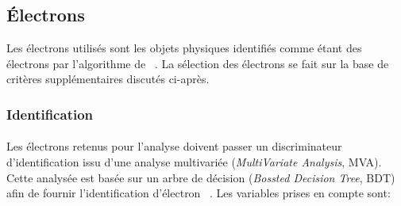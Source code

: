 \subsection{Électrons}\label{chapter-HTT_analysis-section-objects-electrons}
Les électrons utilisés sont les objets physiques identifiés comme étant des électrons par l'algorithme de \PF~\cite{particle-flow}.
La sélection des électrons se fait sur la base de critères supplémentaires discutés ci-après.

\subsubsection{Identification}\label{chapter-HTT_analysis-section-objects-electron-ID}
\paragraph{\EleIDMVA}
Les électrons retenus pour l'analyse doivent passer un discriminateur d'identification issu d'une analyse multivariée (\emph{MultiVariate Analysis}, MVA).
Cette analysée est basée sur un arbre de décision (\emph{Bossted Decision Tree}, BDT) afin de fournir l'identification d'électron \og \EleIDMVA \fg~\cite{cmsElectronMVA}.
Les variables prises en compte sont:
